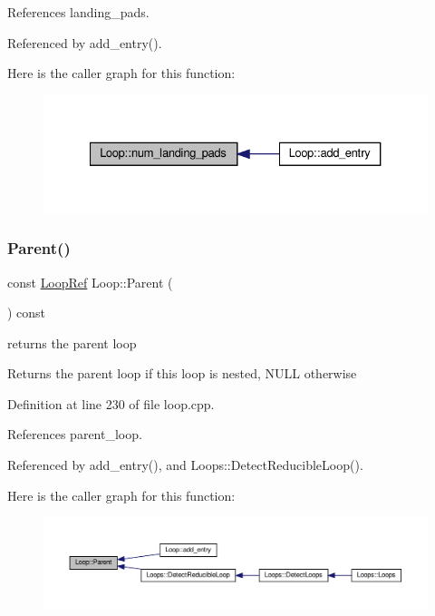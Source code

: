 References landing\+\_\+pads.



Referenced by add\+\_\+entry().

Here is the caller graph for this function\+:
\nopagebreak
\begin{figure}[H]
\begin{center}
\leavevmode
\includegraphics[width=327pt]{de/d77/classLoop_a9c0d7e7c5da776ce054653d85a9d8912_icgraph}
\end{center}
\end{figure}
\mbox{\label{classLoop_a4c564266a0ffeecb0d251db9263d5946}} 
\subsubsection{\texorpdfstring{Parent()}{Parent()}}
{\footnotesize\ttfamily const \hyperlink{loop_8hpp_aa4a60313089619376f67557c4120423c}{Loop\+Ref} Loop\+::\+Parent (\begin{DoxyParamCaption}{ }\end{DoxyParamCaption}) const}



returns the parent loop 

\begin{DoxyReturn}{Returns}
the parent loop if this loop is nested, N\+U\+LL otherwise 
\end{DoxyReturn}


Definition at line 230 of file loop.\+cpp.



References parent\+\_\+loop.



Referenced by add\+\_\+entry(), and Loops\+::\+Detect\+Reducible\+Loop().

Here is the caller graph for this function\+:
\nopagebreak
\begin{figure}[H]
\begin{center}
\leavevmode
\includegraphics[width=350pt]{de/d77/classLoop_a4c564266a0ffeecb0d251db9263d5946_icgraph}
\end{center}
\end{figure}
\mbox{\label{classLoop_add98cb2caef83ae9731be70e45689607}} 
